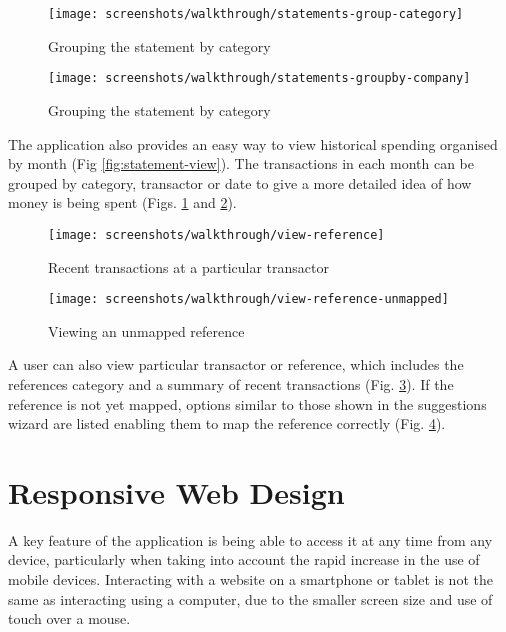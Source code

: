 \begin{figure}
\centering
\texttt{[image: screenshots/walkthrough/statements-group-category]}
\caption{Grouping the statement by category}
\label{fig:statements-group-category}
\end{figure}

\begin{figure}
\centering
\texttt{[image: screenshots/walkthrough/statements-groupby-company]}
\caption{Grouping the statement by category}
\label{fig:statements-groupby-company}
\end{figure}

The application also provides an easy way to view historical spending organised by month (Fig \ref{fig:statement-view}). The transactions in each month can be grouped by category, transactor or date to give a more detailed idea of how money is being spent (Figs. \ref{fig:statements-group-category} and \ref{fig:statements-groupby-company}).

\begin{figure}
\centering
\texttt{[image: screenshots/walkthrough/view-reference]}
\caption{Recent transactions at a particular transactor}
\label{fig:view-reference}
\end{figure}

\begin{figure}
\centering
\texttt{[image: screenshots/walkthrough/view-reference-unmapped]}
\caption{Viewing an unmapped reference}
\label{fig:view-reference-unmapped}
\end{figure}

A user can also view particular transactor or reference, which includes the references category and a summary of recent transactions (Fig. \ref{fig:view-reference}). If the reference is not yet mapped, options similar to those shown in the suggestions wizard are listed enabling them to map the reference correctly (Fig. \ref{fig:view-reference-unmapped}). 

\section[Responsive Design]{Responsive Web Design}
A key feature of the application is being able to access it at any time from any device, particularly when taking into account the rapid increase in the use of mobile devices.  Interacting with a website on a smartphone or tablet is not the same as interacting using a computer, due to the smaller screen size and use of touch over a mouse.

